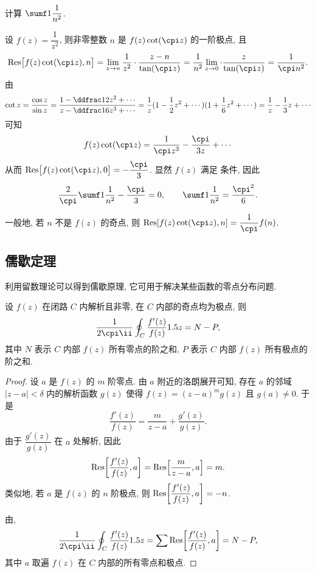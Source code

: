 \begin{example}\label{exam:bessel-question}
  计算 $\sumf1 \dfrac1{n^2}$.
\end{example}

\begin{solution}
  设 $f(z)=\dfrac1{z^2}$, 则非零整数 $n$ 是 $f(z)\cot(\cpi z)$ 的一阶极点, 且
  \[
     \Res\bigl[f(z)\cot(\cpi z),n\bigr]
    =\lim_{z\ra n}\frac1{z^2}\cdot\frac{z-n}{\tan(\cpi z)}
    =\frac1{n^2}\lim_{z\ra 0}\cdot\frac{z}{\tan(\cpi z)}
    =\frac1{\cpi n^2}.
  \]
  由
  \begin{align*}
     \cot z
    =\frac{\cos z}{\sin z}
    =\frac{1-\ddfrac12z^2+\cdots}{z-\ddfrac16z^3+\cdots}
    =\frac1z(1-\frac12z^2+\cdots)(1+\frac16z^2+\cdots)
    =\frac1z-\frac13z+\cdots
  \end{align*}
  可知
  \[
     f(z)\cot(\cpi z)
    =\frac1{\cpi z^3}-\frac{\cpi}{3z}+\cdots
  \]
  从而 $\Res\bigl[f(z)\cot(\cpi z),0\bigr]=-\dfrac\cpi3$.
  显然 $f(z)$ 满足 条件, 因此
  \[
    \frac2\cpi\sumf1 \frac1{n^2}-\frac\cpi3=0,\qquad
    \sumf1 \frac1{n^2}=\frac{\cpi^2}6.
  \]
\end{solution}

一般地, 若 $n$ 不是 $f(z)$ 的奇点, 则 $\Res[f(z)\cot(\cpi z),n]=\dfrac1\cpi f(n)$.


\subsection{儒歇定理}

利用留数理论可以得到儒歇原理, 它可用于解决某些函数的零点分布问题.

\begin{theorem}
  \label{thm:log-f-derivative-sum-order}
  设 $f(z)$ 在闭路 $C$ 内解析且非零, 在 $C$ 内部的奇点均为极点, 则
  \[
    \frac1{2\cpi\ii}\oint_C\frac{f'(z)}{f(z)}\d z
    =N-P,
  \]
  其中 $N$ 表示 $C$ 内部 $f(z)$ 所有零点的阶之和, $P$ 表示 $C$ 内部 $f(z)$ 所有极点的阶之和.
\end{theorem}

\begin{proof}
  设 $a$ 是 $f(z)$ 的 $m$ 阶零点.
  由 $a$ 附近的洛朗展开可知, 存在 $a$ 的邻域 $|z-a|<\delta$ 内的解析函数 $g(z)$ 使得 $f(z)=(z-a)^mg(z)$ 且 $g(a)\neq 0$.
  于是
  \[
    \frac{f'(z)}{f(z)}=\frac m{z-a}+\frac{g'(z)}{g(z)}.
  \]
  由于 $\dfrac{g'(z)}{g(z)}$ 在 $a$ 处解析, 因此
  \[
     {\mathrm{Res}}\biggl[\frac{f'(z)}{f(z)},a\biggr]
    ={\mathrm{Res}}\Bigl[\frac m{z-a},a\Bigr]
    =m.
  \]
  类似地, 若 $a$ 是 $f(z)$ 的 $n$ 阶极点, 则 ${\mathrm{Res}}\biggl[\dfrac{f'(z)}{f(z)},a\biggr]=-n$.

  由\thmRes,
  \[
     \frac1{2\cpi\ii}\oint_C\frac{f'(z)}{f(z)}\d z
    =\sum\Res\biggl[\frac{f'(z)}{f(z)},a\biggr]=N-P,
  \]
  其中 $a$ 取遍 $f(z)$ 在 $C$ 内部的所有零点和极点.
\end{proof}

